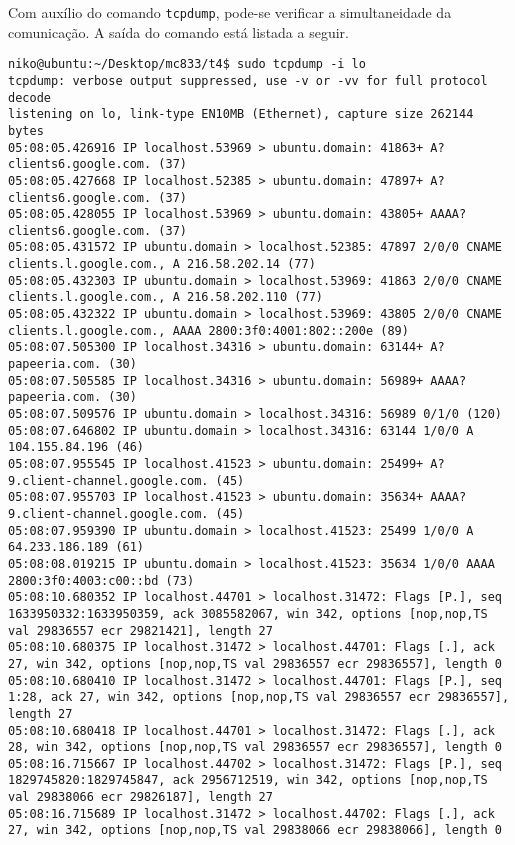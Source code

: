 \documentclass[a4paper,10pt]{article}
\begin{document}
Com auxílio do comando {\tt tcpdump}, pode-se verificar a simultaneidade da comunicação. A saída do comando está listada a seguir.

\begin{lstlisting}
niko@ubuntu:~/Desktop/mc833/t4$ sudo tcpdump -i lo
tcpdump: verbose output suppressed, use -v or -vv for full protocol decode
listening on lo, link-type EN10MB (Ethernet), capture size 262144 bytes
05:08:05.426916 IP localhost.53969 > ubuntu.domain: 41863+ A? clients6.google.com. (37)
05:08:05.427668 IP localhost.52385 > ubuntu.domain: 47897+ A? clients6.google.com. (37)
05:08:05.428055 IP localhost.53969 > ubuntu.domain: 43805+ AAAA? clients6.google.com. (37)
05:08:05.431572 IP ubuntu.domain > localhost.52385: 47897 2/0/0 CNAME clients.l.google.com., A 216.58.202.14 (77)
05:08:05.432303 IP ubuntu.domain > localhost.53969: 41863 2/0/0 CNAME clients.l.google.com., A 216.58.202.110 (77)
05:08:05.432322 IP ubuntu.domain > localhost.53969: 43805 2/0/0 CNAME clients.l.google.com., AAAA 2800:3f0:4001:802::200e (89)
05:08:07.505300 IP localhost.34316 > ubuntu.domain: 63144+ A? papeeria.com. (30)
05:08:07.505585 IP localhost.34316 > ubuntu.domain: 56989+ AAAA? papeeria.com. (30)
05:08:07.509576 IP ubuntu.domain > localhost.34316: 56989 0/1/0 (120)
05:08:07.646802 IP ubuntu.domain > localhost.34316: 63144 1/0/0 A 104.155.84.196 (46)
05:08:07.955545 IP localhost.41523 > ubuntu.domain: 25499+ A? 9.client-channel.google.com. (45)
05:08:07.955703 IP localhost.41523 > ubuntu.domain: 35634+ AAAA? 9.client-channel.google.com. (45)
05:08:07.959390 IP ubuntu.domain > localhost.41523: 25499 1/0/0 A 64.233.186.189 (61)
05:08:08.019215 IP ubuntu.domain > localhost.41523: 35634 1/0/0 AAAA 2800:3f0:4003:c00::bd (73)
05:08:10.680352 IP localhost.44701 > localhost.31472: Flags [P.], seq 1633950332:1633950359, ack 3085582067, win 342, options [nop,nop,TS val 29836557 ecr 29821421], length 27
05:08:10.680375 IP localhost.31472 > localhost.44701: Flags [.], ack 27, win 342, options [nop,nop,TS val 29836557 ecr 29836557], length 0
05:08:10.680410 IP localhost.31472 > localhost.44701: Flags [P.], seq 1:28, ack 27, win 342, options [nop,nop,TS val 29836557 ecr 29836557], length 27
05:08:10.680418 IP localhost.44701 > localhost.31472: Flags [.], ack 28, win 342, options [nop,nop,TS val 29836557 ecr 29836557], length 0
05:08:16.715667 IP localhost.44702 > localhost.31472: Flags [P.], seq 1829745820:1829745847, ack 2956712519, win 342, options [nop,nop,TS val 29838066 ecr 29826187], length 27
05:08:16.715689 IP localhost.31472 > localhost.44702: Flags [.], ack 27, win 342, options [nop,nop,TS val 29838066 ecr 29838066], length 0

\end{lstlisting}
\end{document}
